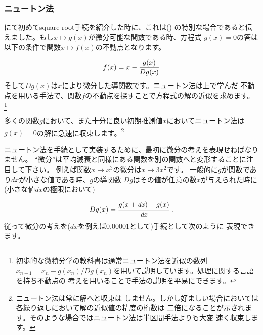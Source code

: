 \subsubsection*{ニュートン法}



にて初めてsquare-root手続を紹介した時に、これは()
の特別な場合であると伝えました。もし\( x \mapsto g(x) \)が微分可能な関数である時、方程式
\( g(x) = 0 \)の答は以下の条件で関数\( x \mapsto f(x) \)の不動点となります。
\begin{comment}

\begin{example}
           g(x)
f(x) = x - -----
           Dg(x)
\end{example}

\end{comment}
\begin{displaymath}
 {f(x) = x} - {g(x)\over Dg(x)} 
\end{displaymath}
\noindent
そして\( Dg(x) \)は\( x \)により微分した導関数です。ニュートン法は上で学んだ
不動点を用いる手法で、関数\( f \)の不動点を探すことで方程式の解の近似を求めます。
\footnote{初歩的な微積分学の教科書は通常ニュートン法を近似の数列\( x_{n+1} = x_n -
g(x_n) / Dg(x_n) \)を用いて説明しています。処理に関する言語を持ち不動点の
考えを用いることで手法の説明を平易にできます。}



多くの関数\( g \)において、また十分に良い初期推測値\( x \)においてニュートン法は
\( g(x) = 0 \)の解に急速に収束します。\footnote{ニュートン法は常に解へと収束は
しません。しかし好ましい場合においては各繰り返しにおいて解の近似値の精度の桁数は
二倍になることが示されます。そのような場合ではニュートン法は半区間手法よりも大変
速く収束します。}



ニュートン法を手続として実装するために、最初に微分の考えを表現せねばなりません。
``微分''は平均減衰と同様にある関数を別の関数へと変形することに注目して下さい。
例えば関数\( x \mapsto x^3 \)の微分は\( x \mapsto 3x^2 \)です。
一般的に\( g \)が関数であり\( dx \)が小さな値である時、\( g \)の導関数
\( Dg \)はその値が任意の数\( x \)が与えられた時に(小さな値\( dx \)の極限において)
\begin{comment}

\begin{example}
        g(x + dx) - g(x)
Dg(x) = ----------------
               dx
\end{example}

\end{comment}
\begin{displaymath}
 {Dg(x)} = {g(x + {\it dx}) - g(x) \over {\it dx}}\,. 
\end{displaymath}
\noindent
従って微分の考えを(\( dx \)を例えば0.00001として)手続として次のように
表現できます。

